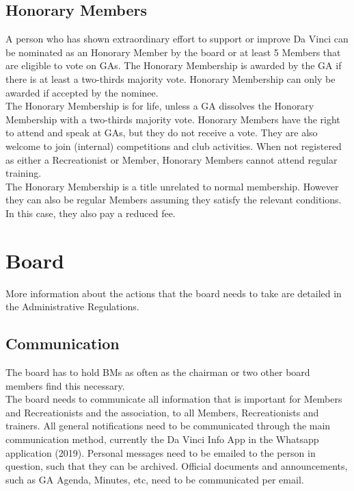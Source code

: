 \documentclass[a4paper]{article}
\newcommand{\Abr}{Administrative Regulations} %
\begin{document}
\subsection{Honorary Members}
A person who has shown extraordinary effort to support or improve Da Vinci can be nominated as an { Honorary Member} by the board or at least 5 { Members} that are eligible to vote on { GA}s.
The { Honorary Membership} is awarded by the { GA} if there is at least a two-thirds majority vote. { Honorary Membership} can only be awarded if accepted by the nominee. \\

The { Honorary Membership} is for life, unless a { GA} dissolves the { Honorary Membership} with a two-thirds majority vote. { Honorary Members} have the right to attend and speak at { GA}s, but they do not receive a vote. They are also welcome to join (internal) competitions and club activities. When not registered as either a { Recreationist} or { Member}, { Honorary Members} cannot attend regular training. \\

The { Honorary Membership} is a title unrelated to normal membership. However they can also be regular { Members} assuming they satisfy the relevant conditions. In this case, they also pay a reduced fee.

\section{Board}
More information about the actions that the board needs to take are detailed in the \Abr .
\subsection{Communication}
The board has to hold { BM}s as often as the chairman or two other board members find this necessary. \\

The board needs to communicate all information that is important for { Members} and { Recreationists} and the association, to all { Members}, { Recreationists} and trainers. All general notifications need to be communicated through the main communication method, currently the Da Vinci Info App in the Whatsapp application {\g (2019)}. Personal messages need to be emailed to the person in question, such that they can be archived. Official documents and announcements, such as { GA} Agenda, Minutes, etc, need to be communicated per email. \\
 
\end{document}

